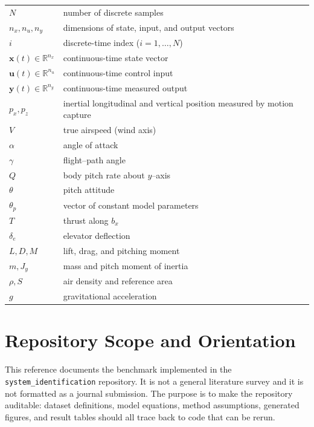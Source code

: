 \documentclass[11pt]{article}
\begin{document}
\begin{longtable}{@{}l @{\quad=\quad} l@{}}
$N$ & number of discrete samples \\
$n_x, n_u, n_y$ & dimensions of state, input, and output vectors \\
$i$ & discrete-time index ($i = 1, \ldots, N$) \\[3pt]
$\mathbf{x}(t) \in \mathbb{R}^{n_x}$ & continuous-time state vector \\
$\mathbf{u}(t) \in \mathbb{R}^{n_u}$ & continuous-time control input \\
$\mathbf{y}(t) \in \mathbb{R}^{n_y}$ & continuous-time measured output \\
$p_x,p_z$ & inertial longitudinal and vertical position measured by motion capture \\
$V$ & true airspeed (wind axis) \\
$\alpha$ & angle of attack\\
$\gamma$ & flight–path angle \\
$Q$ & body pitch rate about $y$–axis \\
$\theta$ & pitch attitude \\
${\theta_p}$ & vector of constant model parameters \\
$T$ & thrust along $b_x$ \\
$\delta_e$ & elevator deflection \\
$L, D, M$ & lift, drag, and pitching moment \\
$m, J_y$ & mass and pitch moment of inertia \\
$\rho, S$ & air density and reference area \\
$g$ & gravitational acceleration \\
\end{longtable}


\section{Repository Scope and Orientation}

This reference documents the benchmark implemented in the \texttt{system\_identification} repository. It is not a general literature survey and it is not formatted as a journal submission. The purpose is to make the repository auditable: dataset definitions, model equations, method assumptions, generated figures, and result tables should all trace back to code that can be rerun.
\end{document}
